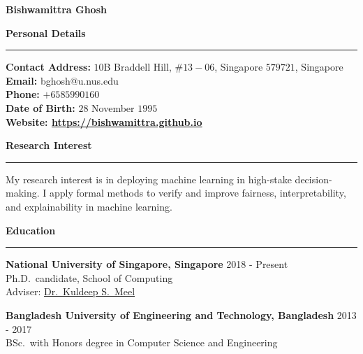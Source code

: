 \documentclass[a4paper,10pt,final]{article}
\newcommand{\Sep}{\vspace{1.5em}}
\newcommand{\SmallSep}{\vspace{0.5em}}
\newcommand{\blue}[1]{\textcolor{blue}{#1}}
\begin{document}
	
	\begin{center}
		\Huge \textbf{Bishwamittra Ghosh}\\
		\vspace{0.2em}	
	\end{center}
	
	\Sep
	\Large { \textbf{Personal Details}}\\
	\noindent\rule{\textwidth}{1pt}
	\normalsize 
	 \textbf{Contact Address:} $ 10 $B Braddell Hill, $ \#13-06 $, Singapore $ 579721 $, Singapore\\
	\textbf{Email:} bghosh@u.nus.edu  \\
	\textbf{Phone:} $ +65 85990160 $\\
	\textbf{Date of Birth:}  $ 28 $  November  $ 1995 $ \\
	\textbf{Website: \blue{\url{https://bishwamittra.github.io}}} 

	\Sep	
\Large { \textbf{Research Interest}}\\
\noindent\rule{\textwidth}{1pt}
\normalsize
My research interest is in deploying machine learning in high-stake decision-making. I apply formal methods to verify and improve fairness, interpretability, and explainability in machine learning. 
	
	\Sep	
\Large { \textbf{Education}}\\
\noindent\rule{\textwidth}{1pt}
\normalsize
\textbf{National University of Singapore, Singapore}
\hspace*{\fill} 2018  - Present\\
Ph.D.\ candidate, School of Computing\\
Adviser: \href{https://www.comp.nus.edu.sg/~meel/}{Dr.\ Kuldeep S.\ Meel}

\SmallSep
\textbf{Bangladesh University of Engineering and Technology, Bangladesh}
\hspace*{\fill} 2013  -  2017\\
BSc.\ with Honors degree in Computer Science and Engineering\\
\end{document}
